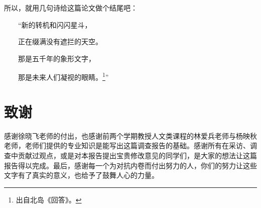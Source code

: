 \documentclass[UTF8,a4paper,fontset=windows,11pt,openany]{ctexbook}
\begin{document}
所以，就用几句诗给这篇论文做个结尾吧：

\ \ \ \ “新的转机和闪闪星斗，

\ \ \ \ 正在缀满没有遮拦的天空。

\ \ \ \ 那是五千年的象形文字，

\ \ \ \ 那是未来人们凝视的眼睛。\footnote{出自北岛《回答》。}”

\newpage
\chapter*{致谢}

感谢徐晓飞老师的付出，也感谢前两个学期教授人文类课程的林爱兵老师与杨映秋老师，老师们提供的专业知识是能写出这篇调查报告的基础。感谢所有在采访、调查中贡献过观点，或是对本报告提出宝贵修改意见的同学们，是大家的想法让这篇报告得以完成。最后，感谢每一个为对抗内卷而付出努力的人，你们的努力让这些文字有了真实的意义，也给予了鼓舞人心的力量。
\end{document}

